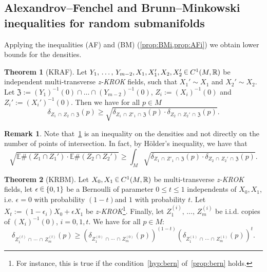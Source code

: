 \documentclass[10pt]{amsart}
\theoremstyle{definition}\newtheorem{defi}[theo]{Definition}\newtheorem{rema}[theo]{Remark}\newtheorem{exam}[theo]{Example}\newtheorem{exem}[theo]{Example}\newtheorem{nota}[theo]{Notation}
\newtheorem{mainthm}{Theorem}
\newcommand{\R}{\mathbb{R}}
\newcommand{\EE}{\mathbb{E}}
\newcommand{\fkZ}{\mathfrak{Z}}
\newcommand{\zkrok}{\emph{z-KROK}\xspace}
\newcommand*\randin{
\mathchoice {\raisebox{-.35ex}{$\displaystyle{^\subset}$}\mkern-11.5mu\raisebox{+.45ex}{$\displaystyle{_\subset}$}} {\mkern+1mu\raisebox{-.27ex}{$\textstyle{^\subset}$}\mkern-11.7mu\raisebox{+.45ex}{$\textstyle{_\subset}$}} {\raisebox{.35ex}{$\scriptstyle\subset$}\mkern-14mu\raisebox{-.15ex}{$\scriptstyle\subset$}} {\raisebox{.3ex}{$\scriptscriptstyle\subset$}\mkern-13.5mu\raisebox{-.10ex}{$\scriptscriptstyle\subset$}}}
\begin{document}
\subsection{Alexandrov--Fenchel and Brunn--Minkowski inequalities for random submanifolds}\label{sub:AFBM}

Applying the inequalities (AF) and (BM) (\cref{prop:BMi,prop:AFi}) we obtain lower bounds for the densities.

\begin{mainthm}[KRAF]\label{cor:KRAF}
Let $Y_1,\,\ldots,\,Y_{m-2},X_1,X_1',X_2,X_2'\,\randin\, C^1(M,\R)$ be independent multi-transverse {\zkrok} fields, such that $X_1'\sim X_1$ and $X_2'\sim X_2$. Let $\fkZ:=(Y_1)^{-1}(0)\cap\ldots\cap(Y_{m-2})^{-1}(0)$, $Z_i:=(X_i)^{-1}(0)$ and $Z_i':=(X_i')^{-1}(0)$. Then we have for all $p\in M$
\begin{equation*}
\delta_{Z_1\,\cap\,Z_2\,\cap\,\fkZ}(p)\geq \sqrt{\delta_{ Z_1\,\cap\,Z'_1\,\cap\,\fkZ}(p)\cdot \delta_{Z_2\,\cap\,Z_2'\,\cap\,\fkZ}(p)}.
\end{equation*}
\end{mainthm}

\begin{rema}
Note that~\cref{cor:KRAF} is an inequality on the densities and not directly on the number of points of intersection. In fact, by H\"older's inequality, we have that
\begin{equation*}
\sqrt{\EE\#\left(Z_1\cap Z_1'\right)\cdot\EE\#\left(Z_2\cap Z_2'\right)}\geq \int_M \sqrt{\delta_{ Z_1\,\cap\,Z'_1\,\cap\,\fkZ}(p)\cdot \delta_{Z_2\,\cap\,Z_2'\,\cap\,\fkZ}(p)}.
\end{equation*}
\end{rema}

\begin{mainthm}[KRBM]\label{cor:KRBM}
Let $X_0, X_1\,\randin\, C^1(M,\R)$ be {multi-transverse} {\zkrok} fields, let $\epsilon\,\randin\,\{0,1\}$ be a Bernoulli of parameter $0\leq t\leq 1$ independents of $X_0,X_1$, i.e. $\epsilon=0$ with probability $(1-t)$and $1$ with probability $t$. Let $X_t:=(1-\epsilon_i) X_0+\epsilon X_1$ be {\zkrok}\footnote{For instance, this is true if the condition~\eqref{hyp:bern} of~\cref{prop:bern} holds.}. Finally, let $Z_1^{(i)},\,\ldots,\,Z_m^{(i)}$ be i.i.d. copies of $(X_i)^{-1}(0)$, $i=0,1,t$. We have for all $p\in M:$
\begin{equation*}
\delta_{Z_1^{(t)}\,\cap\,\cdots\,\cap\,Z_m^{(t)}}(p)\geq \left(\delta_{Z_1^{(0)}\,\cap\,\cdots\,\cap\,Z_m^{(0)}}(p)\right)^{(1-t)}\left(\delta_{Z_1^{(1)}\,\cap\,\cdots\,\cap\,Z_m^{(1)}}(p)\right)^t.
\end{equation*}
\end{mainthm}
\end{document}
